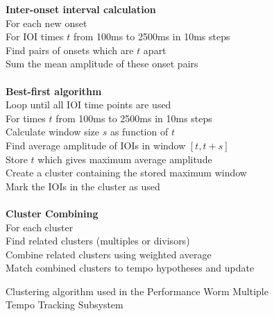 \documentclass[a4paper, 11pt]{article}
\begin{document}
\begin{figure}
	\hspace{10mm} \textbf{Inter-onset interval calculation}\\
	\hspace*{10mm} For each new onset\\
	\hspace*{20mm} For IOI times $\mathit{t}$ from 100ms to 2500ms in 10ms steps\\
	\hspace*{30mm} Find pairs of onsets which are $\mathit{t}$ apart\\
	\hspace*{30mm} Sum the mean amplitude of these onset pairs\\
	\hspace*{20mm} \\
	\hspace*{20mm} \textbf{Best-first algorithm}\\
	\hspace*{20mm} Loop until all IOI time points are used\\
	\hspace*{30mm} For times $\mathit{t}$ from 100ms to 2500ms in 10ms steps\\
	\hspace*{40mm} Calculate window size $\mathit{s}$ as function of $\mathit{t}$\\
	\hspace*{40mm} Find average amplitude of IOIs in window $\mathit{[t, t + s]}$\\
	\hspace*{40mm} Store $\mathit{t}$ which gives maximum average amplitude\\
	\hspace*{30mm} Create a cluster containing the stored maximum window\\
	\hspace*{30mm} Mark the IOIs in the cluster as used\\
	\hspace*{20mm} \\
	\hspace*{20mm} \textbf{Cluster Combining}\\
	\hspace*{20mm} For each cluster\\
	\hspace*{30mm} Find related clusters (multiples or divisors)\\
	\hspace*{30mm} Combine related clusters using weighted average\\
	\hspace*{20mm} Match combined clusters to tempo hypotheses and update\\
	\caption{Clustering algorithm used in the Performance Worm Multiple Tempo Tracking Subsystem \cite{dixonGoeblWidmer}}
	\label{fig: clusterAl}
\end{figure}
\end{document}
